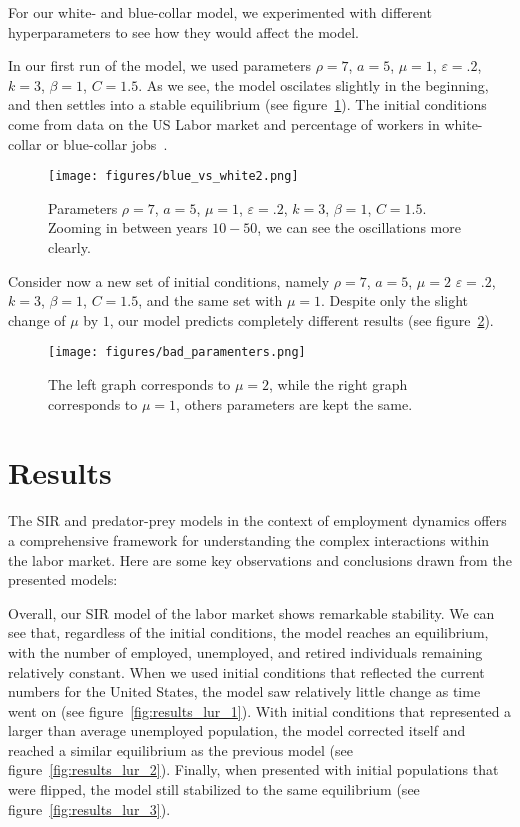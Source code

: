 \documentclass[11pt]{amsart}
\begin{document}
For our white- and blue-collar model, we experimented with different hyperparameters to see how they would affect the model. 

In our first run of the model, we used parameters $\rho = 7$, $a = 5$, $\mu = 1$, $\varepsilon = .2$, $k = 3$, $\beta = 1$, $C = 1.5$. As we see, the model oscilates
slightly in the beginning, and then settles into a stable equilibrium (see figure~\ref{fig:results_wb_1}). The initial conditions come from data on the US Labor market and percentage of workers in white-collar or blue-collar jobs~\cite{BLS}.

\begin{figure}[h]
    \centering
    \texttt{[image: figures/blue\_vs\_white2.png]}
    \caption{Parameters $\rho = 7$, $a = 5$, $\mu = 1$, $\varepsilon = .2$, $k = 3$, $\beta = 1$, $C = 1.5$. Zooming in between years $10-50$, we can see the oscillations more clearly.}
    \label{fig:results_wb_1}
\end{figure}


Consider now a new set of initial conditions, namely $\rho = 7$, $a = 5$, $\mu=2$ $\varepsilon = .2$, $k = 3$, $\beta = 1$, $C = 1.5$, and the same set with $\mu=1$.
Despite only the slight change of $\mu$ by $1$, our model predicts completely different results (see figure~\ref{fig:results_wb_3}).

\begin{figure}[h]
    \centering
    \texttt{[image: figures/bad\_paramenters.png]}
    \caption{The left graph corresponds to $\mu = 2$, while the right graph corresponds to $\mu = 1$, others parameters are kept the same.}
    \label{fig:results_wb_3}
\end{figure}

\section{Results}
The SIR and predator-prey models in the context of employment dynamics offers a comprehensive framework for understanding 
the complex interactions within the labor market. Here are some key observations and conclusions drawn from the presented models:

Overall, our SIR model of the labor market shows remarkable stability. 
We can see that, regardless of the initial conditions, the model reaches an equilibrium, 
with the number of employed, unemployed, and retired individuals remaining relatively constant.
When we used initial conditions that reflected the current numbers for the United States,
the model saw relatively little change as time went on (see figure~\ref{fig:results_lur_1}).
With initial conditions that represented a larger than average unemployed population, the model corrected itself and reached a
similar equilibrium as the previous model (see figure~\ref{fig:results_lur_2}).
Finally, when presented with initial populations that were flipped, the model still stabilized to the same equilibrium
(see figure~\ref{fig:results_lur_3}).
\end{document}
